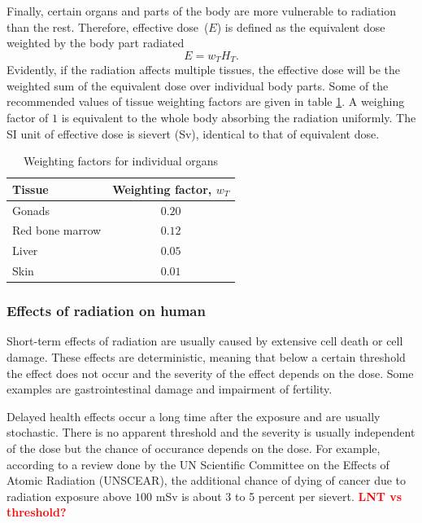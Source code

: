 \documentclass[preprint,aip,pra]{revtex4-1}
\newcommand{\red}[1]{\textcolor{red}{\bf #1}}
\begin{document}
        Finally, certain organs and parts of the body are more vulnerable to radiation than the rest.
        Therefore, effective dose~($E$) is defined as the equivalent dose weighted by the body part
        radiated
        \[E = w_T H_T.\]
        Evidently, if the radiation affects multiple tissues, the effective dose will be the weighted
        sum of the equivalent dose over individual body parts. Some of the recommended values of tissue
        weighting factors are given in table \ref{tab:eff}. A weighing factor of $1$ is equivalent to the
        whole body absorbing the radiation uniformly. The SI unit of effective dose is sievert (Sv),
        identical to that of equivalent dose.
        \begin{table}
            \label{tab:eff}
            \centering
            \caption{Weighting factors for individual organs\cite{icrp74}}
            \begin{ruledtabular}
                \begin{tabular}{l c}
                Tissue & Weighting factor, $w_T$\\
                \hline
                Gonads & $0.20$\\
                Red bone marrow & $0.12$ \\
                Liver & $0.05$ \\
                Skin & $0.01$ \\
                \end{tabular}
            \end{ruledtabular}
        \end{table}
        \subsubsection{Effects of radiation on human}
        Short-term effects of radiation are usually caused by extensive cell death or cell damage.\cite{u16}
        These effects are deterministic, meaning that below a certain threshold the effect does not occur and
        the severity of the effect depends on the dose. Some examples are gastrointestinal damage and impairment
        of fertility.\cite{u16, l01}

        Delayed health effects occur a long time after the exposure and are usually stochastic. There is
        no apparent threshold and the severity is usually independent of the dose but
        the chance of occurance depends on the dose.\cite{u16,l01}
        For example, according to a review done by the UN Scientific Committee on the Effects of Atomic Radiation
        (UNSCEAR), the additional chance of dying of cancer due to radiation exposure above $100$ mSv is
        about 3 to 5 percent per sievert.\cite{unscear12}
        \red{LNT vs threshold?}
\end{document}

